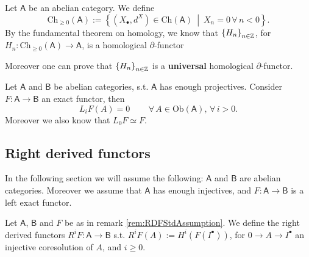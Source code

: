 \begin{rem}[]
	Let $\mathsf{A}$ be an abelian category. We define
	\begin{equation}
	\mathrm{Ch}_{\geq 0}(\mathsf{A}) :=
	\left\{ \left( X_{\bullet}, d^{X} \right) \in \mathrm{Ch}(\mathsf{A}) \ \middle|\ 
	X_n = 0 \,\forall\, n < 0\right\}
	.\end{equation} 
	By the fundamental theorem on homology, we know that $\left\{ H_n \right\}_{n \in \mathbb{Z}}$,
	for $H_n: \mathrm{Ch}_{\geq 0}(\mathsf{A}) \to \mathsf{A}$,
	is a homological $\partial$-functor
\end{rem}

\begin{lem}
	Moreover one can prove that $\left\{ H_n \right\}_{n \in \mathbb{Z}}$ is a \textbf{universal}
	homological $\partial$-functor.
\end{lem} 

\begin{lem}
	Let $\mathsf{A}$ and $\mathsf{B}$ be abelian categories, s.t. $\mathsf{A}$ has enough projectives.
	Consider $F: \mathsf{A} \to \mathsf{B}$ an exact functor, then
	\begin{equation}
		L_i F(A) = 0 \qquad
		\,\forall\, A \in \mathrm{Ob} \left(\mathsf{A}\right), \,\forall\, i > 0
	.\end{equation} 
	Moreover we also know that $L_0 F \simeq F$.
\end{lem} 

\subsection{Right derived functors}
\begin{rem}\label{rem:RDFStdAssumption}
	In the following section we will assume the following:
	$\mathsf{A}$ and $\mathsf{B}$ are abelian categories.
	Moreover we assume that $\mathsf{A}$ has enough injectives, and
	$F: \mathsf{A} \to \mathsf{B}$ is a left exact functor.
\end{rem}

\begin{defn}
	Let $\mathsf{A}$, $\mathsf{B}$ and $F$ be as in remark \ref{rem:RDFStdAssumption}.
	We define the right derived functors
	$R^i F: \mathsf{A} \to \mathsf{B}$ s.t.
	$R^iF(A) := H^i \left( F(I^\bullet) \right)$,
	for $0 \to A \to I^\bullet$ an injective coresolution of $A$, and $i \geq 0$.
\end{defn}

